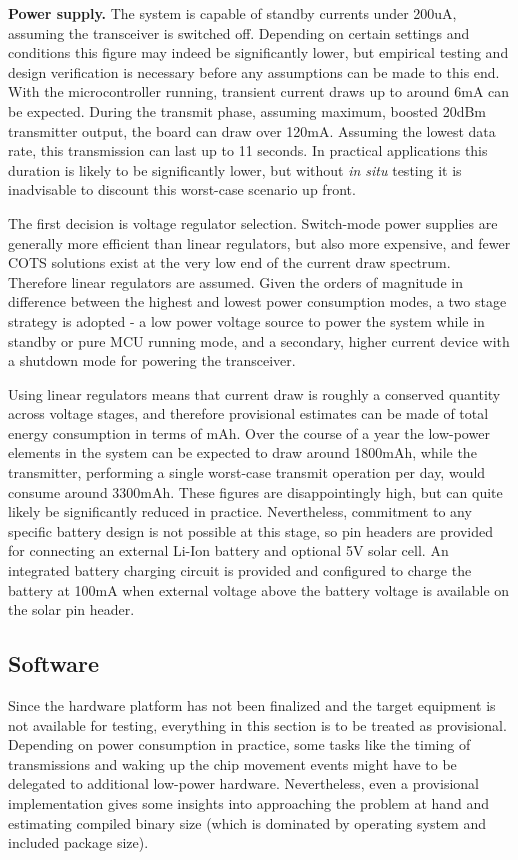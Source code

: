 \documentclass[10pt,nocopyrightspace]{ewsn-proc}
\begin{document}
\textbf{Power supply.} The system is capable of standby currents under 200uA, assuming the transceiver is switched off. Depending on certain settings and conditions this figure may indeed be significantly lower, but empirical testing and design verification is necessary before any assumptions can be made to this end. With the microcontroller running, transient current draws up to around 6mA can be expected. During the transmit phase, assuming maximum, boosted 20dBm transmitter output, the board can draw over 120mA. Assuming the lowest data rate, this transmission can last up to 11 seconds. In practical applications this duration is likely to be significantly lower, but without \textit{in situ} testing it is inadvisable to discount this worst-case scenario up front. 

The first decision is voltage regulator selection. Switch-mode power supplies are generally more efficient than linear regulators, but also more expensive, and fewer COTS solutions exist at the very low end of the current draw spectrum. Therefore linear regulators are assumed. Given the orders of magnitude in difference between the highest and lowest power consumption modes, a two stage strategy is adopted - a low power voltage source to power the system while in standby or pure MCU running mode, and a secondary, higher current device with a shutdown mode for powering the transceiver.

Using linear regulators means that current draw is roughly a conserved quantity across voltage stages, and therefore provisional estimates can be made of total energy consumption in terms of mAh. Over the course of a year the low-power elements in the system can be expected to draw around 1800mAh, while the transmitter, performing a single worst-case transmit operation per day, would consume around 3300mAh. These figures are disappointingly high, but can quite likely be significantly reduced in practice. Nevertheless, commitment to any specific battery design is not possible at this stage, so pin headers are provided for connecting an external Li-Ion battery and optional 5V solar cell. An integrated battery charging circuit is provided and configured to charge the battery at 100mA when external voltage above the battery voltage is available on the solar pin header.

\subsection{Software}
Since the hardware platform has not been finalized and the target equipment is not available for testing, everything in this section is to be treated as provisional. Depending on power consumption in practice, some tasks like the timing of transmissions and waking up the chip movement events might have to be delegated to additional low-power hardware. Nevertheless, even a provisional implementation gives some insights into approaching the problem at hand and estimating compiled binary size (which is dominated by operating system and included package size).
\end{document}
